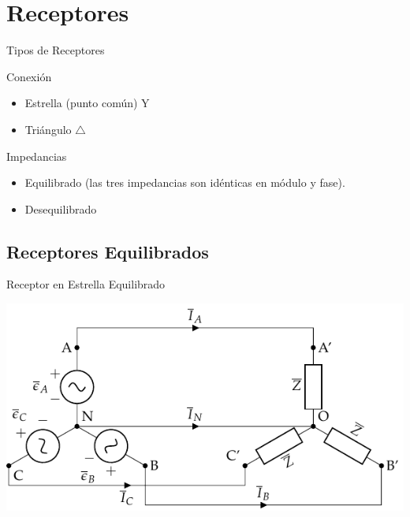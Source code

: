 \documentclass[aspectratio=169, usenames,svgnames,dvipsnames]{beamer}
\begin{document}
\section{Receptores}
\label{sec:orge50d969}
\begin{frame}[label={sec:org8244150}]{Tipos de Receptores}
\begin{block}{Conexión}
\begin{itemize}
\item \alert{Estrella} (punto común) Y
\item \alert{Triángulo} \(\triangle\)
\end{itemize}
\end{block}

\begin{block}{Impedancias}
\begin{itemize}
\item \alert{Equilibrado} (las tres impedancias son idénticas en módulo \alert{y} fase).
\item \alert{Desequilibrado}
\end{itemize}
\end{block}
\end{frame}


\subsection{Receptores Equilibrados}
\label{sec:org816d14a}

\begin{frame}[label={sec:org97666d2}]{Receptor en Estrella Equilibrado}
\begin{center}
\includegraphics[width=.9\linewidth]{../figs/EstrellaEquilibrado.pdf}
\end{center}
\end{frame}
\end{document}
